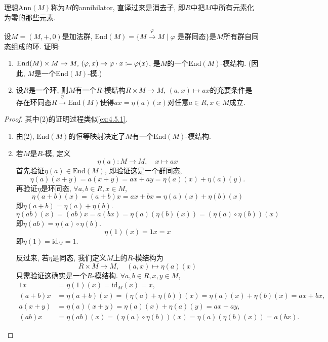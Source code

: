 \begin{remark}
    理想$\mathrm{Ann}(M)$称为$M$的annihilator, 直译过来是消去子, 即$R$中把$M$中所有元素化为零的那些元素.
\end{remark}

\begin{problem}\label{ex:5.1.3}
    设$M = (M, +, 0)$是加法群, $\mathrm{End}(M) = \{M \xrightarrow{\varphi} M \mid \varphi \text{ 是群同态}\}$是$M$所有群自同态组成的环. 证明:
    \begin{enumerate}[(1)]
        \item $\mathrm{End}(M) \times M \to M,\, (\varphi, x) \mapsto \varphi \cdot x \mathrel{\coloneqq} \varphi(x)$, 是$M$的一个$\mathrm{End}(M)$-模结构. (因此, $M$是一个$\mathrm{End}(M)$-模.)
        \item 设$R$是一个环, 则$M$有一个$R$-模结构$R \times M \to M,\, (a, x) \mapsto ax$的充要条件是存在环同态$R \xrightarrow{\eta} \mathrm{End}(M)$使得$ax = \eta(a)(x)$对任意$a \in R, x \in M$成立.
    \end{enumerate}
\end{problem}

\begin{proof}
    其中(2)的证明过程类似\ref{ex:4.5.1}.

    \begin{enumerate}[(1)]
        \item 由(2), $\mathrm{End}(M)$的恒等映射决定了$M$有一个$\mathrm{End}(M)$-模结构.
        \item 若$M$是$R$-模, 定义
        \[
            \eta(a):M \to M,\quad x \mapsto ax
        \]
        首先验证$\eta(a) \in \mathrm{End}(M)$, 即验证这是一个群同态,
        \[
            \eta(a)(x + y) = a(x + y) = ax + ay = \eta(a)(x) + \eta(a)(y).
        \]
        再验证$\eta$是环同态, $\forall a, b \in R, x \in M$,
        \[
            \eta(a + b)(x) = (a + b)x = ax + bx = \eta(a)(x) + \eta(b)(x)
        \]
        即$\eta(a + b) = \eta(a) + \eta(b)$.
        \[
            \eta(ab)(x) = (ab)x = a(bx) = \eta(a)(\eta(b)(x)) = (\eta(a) \circ \eta(b))(x)
        \]
        即$\eta(ab) = \eta(a) \circ \eta(b)$.
        \[
            \eta(1)(x) = 1x = x
        \]
        即$\eta(1) = \mathrm{id}_M = 1$.

        反过来, 若$\eta$是同态, 我们定义$M$上的$R$-模结构为
        \[
            R \times M \to M,\quad (a, x) \mapsto \eta(a)(x)
        \]
        只需验证这确实是一个$R$-模结构. $\forall a, b \in R, x, y \in M$,
        \[
        \begin{aligned}
            1x &= \eta(1)(x) = \mathrm{id}_M(x) = x,\\
            (a + b)x &= \eta(a + b)(x) = (\eta(a) + \eta(b))(x) = \eta(a)(x) + \eta(b)(x) = ax + bx,\\
            a(x + y) &= \eta(a)(x + y) = \eta(a)(x) + \eta(a)(y) = ax + ay,\\
            (ab)x &= \eta(ab)(x) = (\eta(a) \circ \eta(b))(x) = \eta(a)(\eta(b)(x)) = a(bx).
        \end{aligned}
        \]
    \end{enumerate}
\end{proof}

